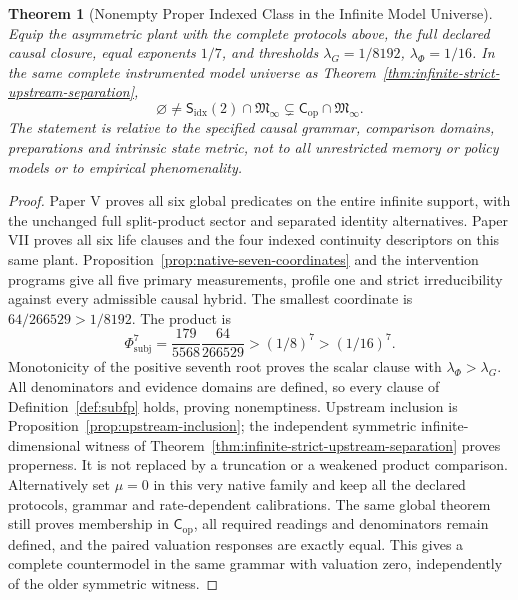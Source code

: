 \documentclass[11pt,a4paper]{article}
\newtheorem{theorem}{Theorem}[section]
\theoremstyle{definition}
\newcommand{\Cop}{\mathsf{C}_{\mathrm{op}}}
\newcommand{\Subfp}{\mathsf{S}_{\mathrm{idx}}}
\newcommand{\PhiSubj}{\Phi_{\mathrm{subj}}}
\begin{document}
\begin{theorem}[Nonempty Proper Indexed Class in the Infinite Model Universe]
\label{thm:native-nonempty-subfp}
Equip the asymmetric plant with the complete protocols above, the full declared
causal closure, equal exponents $1/7$, and thresholds
$\lambda_G=1/8192$, $\lambda_\Phi=1/16$. In the same complete instrumented
model universe as Theorem~\ref{thm:infinite-strict-upstream-separation},
\[
 \varnothing\ne\Subfp(2)\cap\mathfrak M_\infty
 \subsetneq\Cop\cap\mathfrak M_\infty.
\]
The statement is relative to the specified causal grammar, comparison domains,
preparations and intrinsic state metric, not to all unrestricted memory or
policy models or to empirical phenomenality.
\end{theorem}
\begin{proof}
Paper V proves all six global predicates on the entire infinite support,
with the unchanged full split-product sector and separated identity alternatives.
Paper VII proves all six life clauses and the four indexed continuity
descriptors on this same plant. Proposition~\ref{prop:native-seven-coordinates}
and the intervention programs give all five primary measurements, profile one
and strict irreducibility against every admissible causal hybrid.
The smallest coordinate is $64/266529>1/8192$. The product is
\[
 \PhiSubj^7=\frac{179}{5568}\frac{64}{266529}>(1/8)^7>(1/16)^7.
\]
Monotonicity of the positive seventh root proves the scalar clause with
$\lambda_\Phi>\lambda_G$. All denominators and evidence domains are defined,
so every clause of Definition~\ref{def:subfp} holds, proving nonemptiness.
Upstream inclusion is Proposition~\ref{prop:upstream-inclusion}; the independent
symmetric infinite-dimensional witness of
Theorem~\ref{thm:infinite-strict-upstream-separation} proves properness.
It is not replaced by a truncation or a weakened product comparison.
Alternatively set $\mu=0$ in this very native family and keep all the declared
protocols, grammar and rate-dependent calibrations. The same global theorem
still proves membership in $\Cop$, all required readings and denominators
remain defined, and the paired valuation responses are exactly equal.
This gives a complete countermodel in the same grammar with valuation zero,
independently of the older symmetric witness.
\end{proof}
\end{document}
